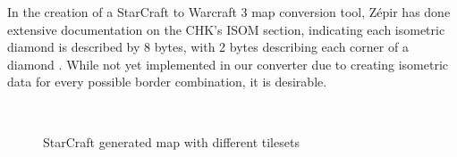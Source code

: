 \documentclass[letterpaper]{article}
\begin{document}
In the creation of a StarCraft to Warcraft 3 map conversion tool, Z\'{e}pir has done extensive documentation on the CHK's ISOM section, indicating each isometric diamond is described by 8 bytes, with 2 bytes describing each corner of a diamond \cite{Zepir}. While not yet implemented in our converter due to creating isometric data for every possible border combination, it is desirable.

\begin{figure}[ht]
  \centering
  ~ %
  ~ %
  \caption{StarCraft generated map with different tilesets}
  \label{fig:final-maps}
\end{figure}
\end{document}
